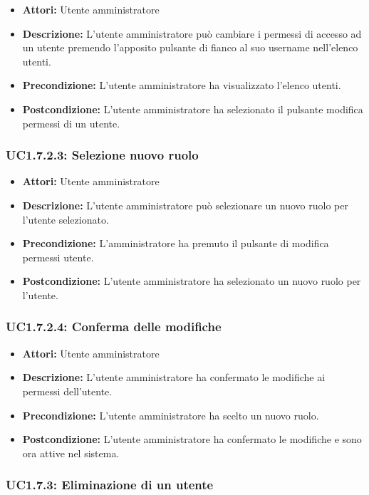 \begin{itemize}
    \item \textbf{Attori:} Utente amministratore
    \item \textbf{Descrizione:} L'utente amministratore può cambiare i permessi di accesso ad un utente premendo l'apposito pulsante di fianco al suo username nell'elenco utenti.
    \item \textbf{Precondizione:} L'utente amministratore ha visualizzato l'elenco utenti.
    \item \textbf{Postcondizione:} L'utente amministratore ha selezionato il pulsante modifica permessi di un utente.
\end{itemize}

\subsubsection{UC1.7.2.3: Selezione nuovo ruolo}

\begin{itemize}
    \item \textbf{Attori:} Utente amministratore
    \item \textbf{Descrizione:} L'utente amministratore può selezionare un nuovo ruolo per l'utente selezionato.
    \item \textbf{Precondizione:} L'amministratore ha premuto il pulsante di modifica permessi utente.
    \item \textbf{Postcondizione:} L'utente amministratore ha selezionato un nuovo ruolo per l'utente.
\end{itemize}

\subsubsection{UC1.7.2.4: Conferma delle modifiche}

\begin{itemize}
    \item \textbf{Attori:} Utente amministratore
    \item \textbf{Descrizione:} L'utente amministratore ha confermato le modifiche ai permessi dell'utente.
    \item \textbf{Precondizione:} L'utente amministratore ha scelto un nuovo ruolo.
    \item \textbf{Postcondizione:} L'utente amministratore ha confermato le modifiche e sono ora attive nel sistema.
\end{itemize}

\subsubsection{UC1.7.3: Eliminazione di un utente}

